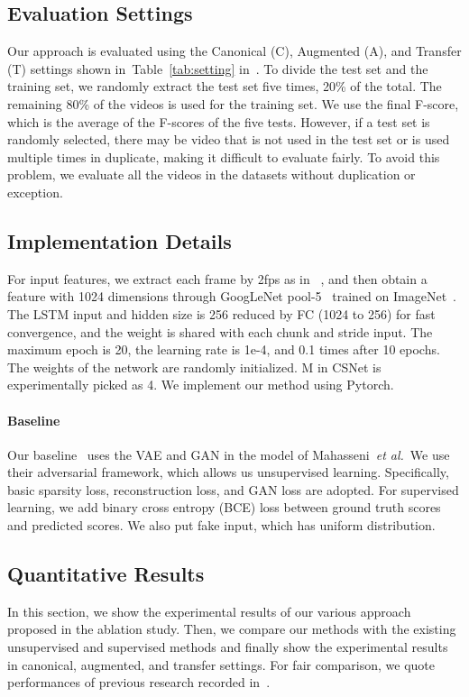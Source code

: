 \documentclass[letterpaper]{article} \usepackage{aaai19}  \usepackage{times}  \usepackage{helvet}  \usepackage{courier}  \usepackage{url}  \usepackage{graphicx}  \frenchspacing  \setlength{\pdfpagewidth}{8.5in}  \setlength{\pdfpageheight}{11in}
\newcommand{\tabref}[1]{Table~\ref{#1}}
\newcommand{\etal}{\textit{et al.}}
\begin{document}
\subsection{Evaluation Settings}
Our approach is evaluated using the Canonical (C), Augmented (A), and Transfer (T) settings shown in~\tabref{tab:setting} in~\cite{zhang2016video}. To divide the test set and the training set, we randomly extract the test set five times, 20\% of the total. The remaining 80\% of the videos is used for the training set. We use the final F-score, which is the average of the F-scores of the five tests. However, if a test set is randomly selected, there may be video that is not used in the test set or is used multiple times in duplicate, making it difficult to evaluate fairly. To avoid this problem, we evaluate all the videos in the datasets without duplication or exception.


\subsection{Implementation Details}
For input features, we extract each frame by 2fps as in ~\cite{zhang2016video}, and then obtain a feature with 1024 dimensions through GoogLeNet pool-5~\cite{szegedy2015going} trained on ImageNet~\cite{russakovsky2015imagenet}. The LSTM input and hidden size is 256 reduced by FC (1024 to 256) for fast convergence, and the weight is shared with each chunk and stride input. The maximum epoch is 20, the learning rate is 1e-4, and 0.1 times after 10 epochs. The weights of the network are randomly initialized. M in CSNet is experimentally picked as 4. We implement our method using Pytorch.

\paragraph{Baseline}
Our baseline~\cite{Mahasseni2017VAEGAN} uses the VAE and GAN in the model of Mahasseni~\etal~We use their adversarial framework, which allows us unsupervised learning. Specifically, basic sparsity loss, reconstruction loss, and GAN loss are adopted. For supervised learning, we add binary cross entropy (BCE) loss between ground truth scores and predicted scores. We also put fake input, which has uniform distribution. 



\subsection{Quantitative Results}
In this section, we show the experimental results of our various approach proposed in the ablation study. Then, we compare our methods with the existing unsupervised and supervised methods and finally show the experimental results in canonical, augmented, and transfer settings. For fair comparison, we quote performances of previous research recorded in~\cite{zhou2017deep}.
\end{document}
